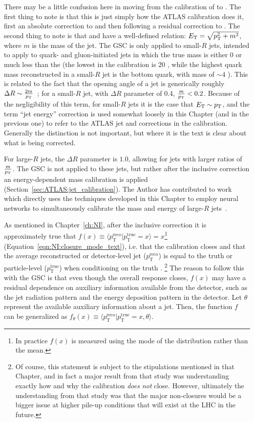 There may be a little confusion here in moving from the calibration of \Et{} to \pt{}.
The first thing to note is that this is just simply how the ATLAS calibration does it, first an absolute correction to \Et{} and then following a residual correction to \pt{}.
The second thing to note is that \Et{} and \pt{} have a well-defined relation: $E_{\text{T}}=\sqrt{p_{\text{T}}^2+m^2}$, where $m$ is the mass of the jet.
The GSC is only applied to small-$R$ jets, intended to apply to quark- and gluon-initiated jets in which the true mass is either $0$ or much less than the \pt{} (the lowest \pt{} in the calibration is 20 \GeV, while the highest quark mass reconstructed in a small-$R$ jet is the bottom quark, with mass of $\sim4$ \GeV).
This is related to the fact that the opening angle of a jet is generically roughly $\Delta R \sim \frac{2m}{p_{\text{T}}}$~\cite{Shelton:2013an}; for a small-$R$ jet, with $\Delta R$ parameter of 0.4, $\frac{m}{p_{\text{T}}}<0.2$.
Because of the negligibility of this term, for small-$R$ jets it is the case that $E_{\text{T}}\sim p_{\text{T}}$, and the term ``jet energy'' correction is used somewhat loosely in this Chapter (and in the previous one) to refer to the ATLAS jet \Et{} and \pT{} corrections in the calibration.
Generally the distinction is not important, but where it is the text is clear about what is being corrected.

For large-$R$ jets, the $\Delta R$ parameter is $1.0$, allowing for jets with larger ratios of $\frac{m}{p_{\text{T}}}$.
The GSC is not applied to these jets, but rather after the inclusive \Et{} correction an energy-dependent mass calibration is applied (Section~\ref{sec:ATLAS:jet_calibration}).
The Author has contributed to work which directly uses the techniques developed in this Chapter to employ neural networks to simultaneously calibrate the mass and energy of large-$R$ jets~\cite{ATL-PHYS-PUB-2020-001}.

As mentioned in Chapter~\ref{ch:NI}, after the inclusive correction it is approximately true that $f(x)\equiv \langle p_\text{T}^\text{reco}|p_\text{T}^\text{true}=x\rangle = x$\footnote{In practice $f(x)$ is measured using the mode of the distribution rather than the mean.} (Equation~\ref{eqn:NI:closure_mode_text}), i.e. that the calibration closes and that the average reconstructed or detector-level jet \pt{} ($p_\text{T}^\text{reco}$) is equal to the truth or particle-level \pt{} ($p_\text{T}^\text{true}$) when conditioning on the truth \pt{}.
\footnote{Of course, this statement is subject to the stipulations mentioned in that Chapter, and in fact a major result from that study was understanding exactly how and why the calibration \textit{does not} close. However, ultimately the understanding from that study was that the major non-closures would be a bigger issue at higher pile-up conditions that will exist at the LHC in the future.}
The reason to follow this with the GSC is that even though the overall response closes, $f(x)$ may have a residual dependence on auxiliary information available from the detector, such as the jet radiation pattern and the energy deposition pattern in the detector.
Let $\theta$ represent the available auxiliary information about a jet.
Then, the function $f$ can be generalized as $f_\theta(x)\equiv \langle p_\text{T}^\text{reco}|p_\text{T}^\text{true}=x,\theta\rangle$.

